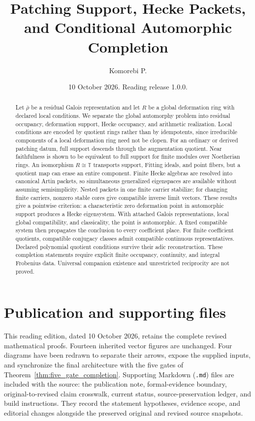 \documentclass[11pt]{amsart}
\title[Patching support and automorphic completion]{Patching Support, Hecke Packets, and Conditional Automorphic Completion}
\author[Komorebi P.]{Komorebi P.}
\date{10 October 2026. Reading release 1.0.0.}
\theoremstyle{definition}
\theoremstyle{remark}
\newcommand{\TT}{\mathbb T}
\begin{document}
\KomorebiCover


\begin{abstract}
Let \(\bar\rho\) be a residual Galois representation and let \(R\) be a global deformation ring with declared local conditions. We separate the global automorphy problem into residual occupancy, deformation support, Hecke occupancy, and arithmetic realization. Local conditions are encoded by quotient rings rather than by idempotents, since irreducible components of a local deformation ring need not be clopen. For an ordinary or derived patching datum, full support descends through the augmentation quotient. Near faithfulness is shown to be equivalent to full support for finite modules over Noetherian rings. An isomorphism \(R\cong\TT\) transports support, Fitting ideals, and point fibers, but a quotient map can erase an entire component. Finite Hecke algebras are resolved into canonical Artin packets, so simultaneous generalized eigenspaces are available without assuming semisimplicity. Nested packets in one finite carrier stabilize; for changing finite carriers, nonzero stable cores give compatible inverse limit vectors. These results give a pointwise criterion: a characteristic zero deformation point in automorphic support produces a Hecke eigensystem. With attached Galois representations, local global compatibility, and classicality, the point is automorphic. A fixed compatible system then propagates the conclusion to every coefficient place. For finite coefficient quotients, compatible conjugacy classes admit compatible continuous representatives. Declared polynomial quotient conditions survive their adic reconstruction. These completion statements require explicit finite occupancy, continuity, and integral Frobenius data. Universal companion existence and unrestricted reciprocity are not proved.
\end{abstract}
\makeatletter\@setabstract\makeatother
\thispagestyle{plain}

\section*{Publication and supporting files}
This reading edition, dated 10 October 2026, retains the complete revised mathematical proofs. Fourteen inherited vector figures are unchanged. Four diagrams have been redrawn to separate their arrows, expose the supplied inputs, and synchronize the final architecture with the five gates of Theorem~\ref{thm:five_gate_completion}. Supporting Markdown (\texttt{.md}) files are included with the source: the publication note, formal-evidence boundary, original-to-revised claim crosswalk, current status, source-preservation ledger, and build instructions. They record the statement hypotheses, evidence scope, and editorial changes alongside the preserved original and revised source snapshots.
\end{document}
